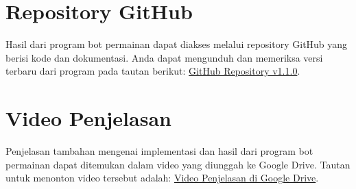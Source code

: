 \section{Repository GitHub}
Hasil dari program bot permainan dapat diakses melalui repository GitHub yang berisi kode dan dokumentasi. Anda dapat mengunduh dan memeriksa versi terbaru dari program pada tautan berikut:
\href{https://github.com/haziqam/tubes1-IF2211-game-engine/releases/tag/v1.1.0}{GitHub Repository v1.1.0}.

\section{Video Penjelasan}
Penjelasan tambahan mengenai implementasi dan hasil dari program bot permainan dapat ditemukan dalam video yang diunggah ke Google Drive. Tautan untuk menonton video tersebut adalah:
\href{https://drive.google.com}{Video Penjelasan di Google Drive}.